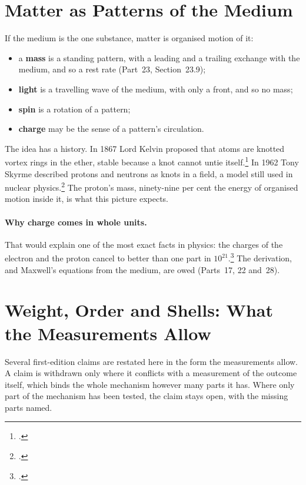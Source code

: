 \documentclass[11pt,a4paper]{article}
\newcommand{\fn}[1]{\footnote{\citealp{#1}.}}
\begin{document}
\section{Matter as Patterns of the Medium}
\label{sec:matter}

\begin{hypbar}
If the medium is the one substance, matter is organised motion of it:
\begin{itemize}
\item a \textbf{mass} is a standing pattern, with a leading and a trailing exchange with the medium, and so a rest rate (Part~23, Section~23.9);
\item \textbf{light} is a travelling wave of the medium, with only a front, and so no mass;
\item \textbf{spin} is a rotation of a pattern;
\item \textbf{charge} may be the sense of a pattern's circulation.
\end{itemize}
\end{hypbar}

The idea has a history. In 1867 Lord Kelvin proposed that atoms are knotted vortex rings in the ether, stable because a knot cannot untie itself.\fn{kelvin1867} In 1962 Tony Skyrme described protons and neutrons as knots in a field, a model still used in nuclear physics.\fn{skyrme1962} The proton's mass, ninety-nine per cent the energy of organised motion inside it, is what this picture expects.

\paragraph{Why charge comes in whole units.}  That would explain one of the most exact facts in physics: the charges of the electron and the proton cancel to better than one part in $10^{21}$.\fn{bressi2011} The derivation, and Maxwell's equations from the medium, are owed (Parts~17, 22 and~28).

\section{Weight, Order and Shells: What the Measurements Allow}
\label{sec:not}

Several first-edition claims are restated here in the form the measurements allow. A claim is withdrawn only where it conflicts with a measurement of the outcome itself, which binds the whole mechanism however many parts it has. Where only part of the mechanism has been tested, the claim stays open, with the missing parts named.
\end{document}
